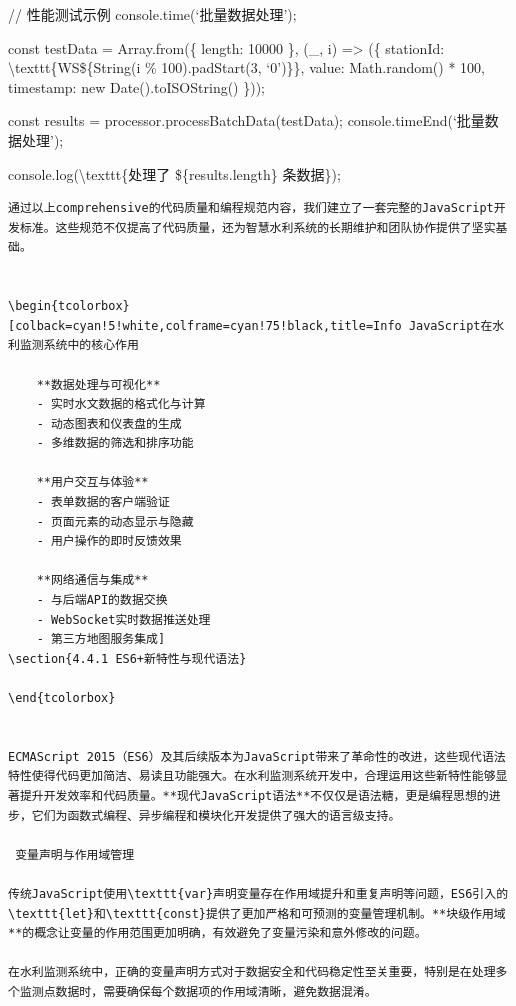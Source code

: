 {{// 性能测试示例 console.time(`批量数据处理');

const testData = Array.from(\{ length: 10000 \}, (\_, i) =\textgreater{} (\{ stationId: \textbackslash texttt\{WS\$\{String(i \% 100).padStart(3, `0')\}\}, value: Math.random() * 100, timestamp: new Date().toISOString() \}));

const results = processor.processBatchData(testData); console.timeEnd(`批量数据处理');

console.log(\textbackslash texttt\{处理了 \$\{results.length\} 条数据\});

\begin{lstlisting}
通过以上comprehensive的代码质量和编程规范内容，我们建立了一套完整的JavaScript开发标准。这些规范不仅提高了代码质量，还为智慧水利系统的长期维护和团队协作提供了坚实基础。


\begin{tcolorbox}[colback=cyan!5!white,colframe=cyan!75!black,title=Info JavaScript在水利监测系统中的核心作用
    
    **数据处理与可视化**
    - 实时水文数据的格式化与计算
    - 动态图表和仪表盘的生成
    - 多维数据的筛选和排序功能
    
    **用户交互与体验**
    - 表单数据的客户端验证
    - 页面元素的动态显示与隐藏
    - 用户操作的即时反馈效果
    
    **网络通信与集成**
    - 与后端API的数据交换
    - WebSocket实时数据推送处理
    - 第三方地图服务集成]
\section{4.4.1 ES6+新特性与现代语法}

\end{tcolorbox}


ECMAScript 2015（ES6）及其后续版本为JavaScript带来了革命性的改进，这些现代语法特性使得代码更加简洁、易读且功能强大。在水利监测系统开发中，合理运用这些新特性能够显著提升开发效率和代码质量。**现代JavaScript语法**不仅仅是语法糖，更是编程思想的进步，它们为函数式编程、异步编程和模块化开发提供了强大的语言级支持。

 变量声明与作用域管理

传统JavaScript使用\texttt{var}声明变量存在作用域提升和重复声明等问题，ES6引入的\texttt{let}和\texttt{const}提供了更加严格和可预测的变量管理机制。**块级作用域**的概念让变量的作用范围更加明确，有效避免了变量污染和意外修改的问题。

在水利监测系统中，正确的变量声明方式对于数据安全和代码稳定性至关重要，特别是在处理多个监测点数据时，需要确保每个数据项的作用域清晰，避免数据混淆。
\end{lstlisting}

}}
